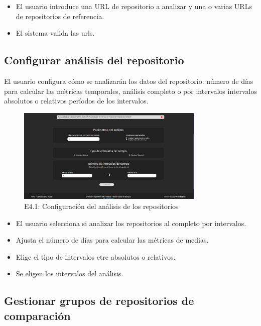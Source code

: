 \begin{itemize}
    \item El usuario introduce una URL de repositorio a analizar y una o varias URLs de repositorios de referencia.
    \item El sistema valida las urls.
\end{itemize}

\newpage
\subsection{Configurar análisis del repositorio}

El usuario configura cómo se analizarán los datos del repositorio: número de días para calcular las métricas temporales, análisis completo o por intervalos intervalos absolutos o relativos períodos de los intervalos.

\begin{figure}[H]
\centering
\includegraphics[width=0.8\textwidth]{img/E4.1-configuracion-analisis.png}
\caption{E4.1: Configuración del análisis de los repositorios}
\label{fig:E4.1-configuracion-analisis}
\end{figure}

\begin{itemize}
    \item El usuario selecciona si analizar los repositorios al completo por intervalos.
    \item Ajusta el número de días para calcular las métricas de medias.
    \item Elige el tipo de intervalos etre absolutos o relativos.
    \item Se eligen los intervalos del análisis.
\end{itemize}

\newpage
\subsection{Gestionar grupos de repositorios de comparación}

